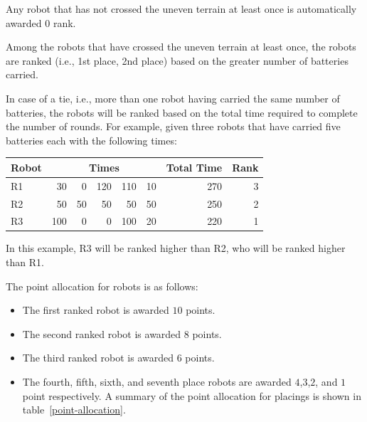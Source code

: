 \documentclass[12pt]{hurocup}
\begin{document}

\begin{lawlist}[LC]
\item Any robot that has not crossed the uneven terrain at least once is
  automatically awarded $0$ rank.

\item Among the robots that have crossed the uneven terrain at least
  once, the robots are ranked (i.e., 1st place, 2nd place) based on
  the greater number of batteries carried.

\item In case of a tie, i.e., more than one robot having carried the
  same number of batteries, the robots will be ranked based on the
  total time required to complete the number of rounds. For example,
  given three robots that have carried five batteries each with the
  following times:

      \begin{center}
        \begin{tabular}{l|rrrrr|r|r|}
          \hline
          Robot & \multicolumn{5}{c}{Times} & Total Time & Rank \\
          \hline
          R1 & 30 & 0 & 120 & 110 & 10 & 270 & 3 \\
          R2 & 50 & 50 & 50 & 50 & 50 & 250 & 2 \\
          R3 & 100 & 0 & 0 & 100 & 20 & 220 & 1 \\
          \hline
        \end{tabular}
      \end{center}

  In this example, R3 will be ranked higher than R2, who will be
  ranked higher than R1.

\item The point allocation for robots is as follows:
  \begin{itemize}
  \item The first ranked robot is awarded $10$ points.
  \item The second ranked robot is awarded $8$ points.
  \item The third ranked robot is awarded $6$ points.
  \item The fourth, fifth, sixth, and seventh place robots are awarded
    $4$,$3$,$2$, and $1$ point respectively.  A summary of the point
    allocation for placings is shown in table~\ref{point-allocation}.


\end{itemize}
\end{lawlist}
\end{document}
